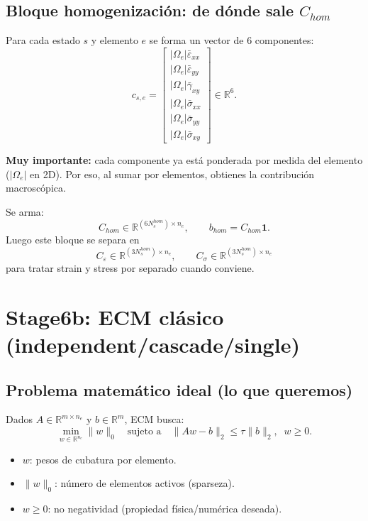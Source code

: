 \documentclass[11pt,a4paper]{article}
\begin{document}
\subsection{Bloque homogenización: de dónde sale $C_{hom}$}
Para cada estado $s$ y elemento $e$ se forma un vector de 6 componentes:
\[
c_{s,e}=
\begin{bmatrix}
|\Omega_e|\bar\varepsilon_{xx}\\
|\Omega_e|\bar\varepsilon_{yy}\\
|\Omega_e|\bar\gamma_{xy}\\
|\Omega_e|\bar\sigma_{xx}\\
|\Omega_e|\bar\sigma_{yy}\\
|\Omega_e|\bar\sigma_{xy}
\end{bmatrix}\in\mathbb{R}^{6}.
\]

\textbf{Muy importante:} cada componente ya está ponderada por medida del elemento
($|\Omega_e|$ en 2D). Por eso, al sumar por elementos, obtienes la contribución macroscópica.

Se arma:
\[
C_{hom}\in\mathbb{R}^{(6N_s^{hom})\times n_e},\qquad
b_{hom}=C_{hom}\mathbf{1}.
\]
Luego este bloque se separa en
\[
C_{\varepsilon}\in\mathbb{R}^{(3N_s^{hom})\times n_e},\qquad
C_{\sigma}\in\mathbb{R}^{(3N_s^{hom})\times n_e}
\]
para tratar strain y stress por separado cuando conviene.

\section{Stage6b: ECM clásico (independent/cascade/single)}
\subsection{Problema matemático ideal (lo que queremos)}
Dados $A\in\mathbb{R}^{m\times n_e}$ y $b\in\mathbb{R}^m$, ECM busca:
\[
\min_{w\in\mathbb{R}^{n_e}} \|w\|_0
\quad\text{sujeto a}\quad
\|Aw-b\|_2\le \tau\|b\|_2,\;\; w\ge 0.
\]
\begin{itemize}[leftmargin=1.5em]
\item $w$: pesos de cubatura por elemento.
\item $\|w\|_0$: número de elementos activos (sparseza).
\item $w\ge 0$: no negatividad (propiedad física/numérica deseada).
\end{itemize}
\end{document}
